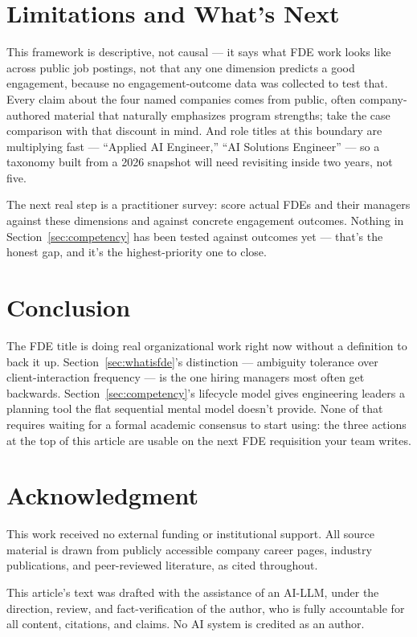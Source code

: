 \documentclass[journal]{IEEEtran}
\begin{document}
\section{Limitations and What's Next}
\label{sec:limitations}

This framework is descriptive, not causal --- it says what FDE work looks like across public job postings, not that any one dimension predicts a good engagement, because no engagement-outcome data was collected to test that. Every claim about the four named companies comes from public, often company-authored material that naturally emphasizes program strengths; take the case comparison with that discount in mind. And role titles at this boundary are multiplying fast --- ``Applied AI Engineer,'' ``AI Solutions Engineer'' --- so a taxonomy built from a 2026 snapshot will need revisiting inside two years, not five.

The next real step is a practitioner survey: score actual FDEs and their managers against these dimensions and against concrete engagement outcomes. Nothing in Section~\ref{sec:competency} has been tested against outcomes yet --- that's the honest gap, and it's the highest-priority one to close.

\section{Conclusion}
\label{sec:conclusion}

The FDE title is doing real organizational work right now without a definition to back it up. Section~\ref{sec:whatisfde}'s distinction --- ambiguity tolerance over client-interaction frequency --- is the one hiring managers most often get backwards. Section~\ref{sec:competency}'s lifecycle model gives engineering leaders a planning tool the flat sequential mental model doesn't provide. None of that requires waiting for a formal academic consensus to start using: the three actions at the top of this article are usable on the next FDE requisition your team writes.

\section*{Acknowledgment}
This work received no external funding or institutional support. All source material is drawn from publicly accessible company career pages, industry publications, and peer-reviewed literature, as cited throughout.

This article's text was drafted with the assistance of an AI-LLM, under the direction, review, and fact-verification of the author, who is fully accountable for all content, citations, and claims. No AI system is credited as an author.
\end{document}
